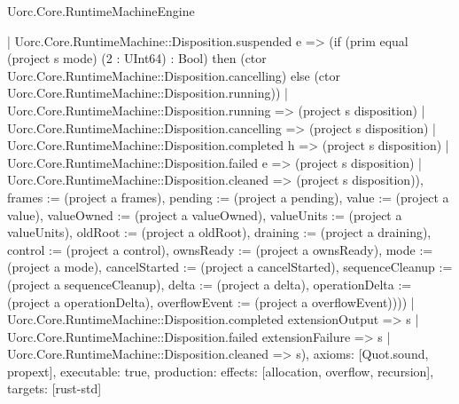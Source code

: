 \begin{lexlean}{Uorc.Core.RuntimeMachineEngine}
\begin{semanticmodule}
{{        | Uorc.Core.RuntimeMachine::Disposition.suspended e => (if (prim equal (project s mode) (2 : UInt64) : Bool) then (ctor Uorc.Core.RuntimeMachine::Disposition.cancelling) else (ctor Uorc.Core.RuntimeMachine::Disposition.running))
        | Uorc.Core.RuntimeMachine::Disposition.running => (project s disposition)
        | Uorc.Core.RuntimeMachine::Disposition.cancelling => (project s disposition)
        | Uorc.Core.RuntimeMachine::Disposition.completed h => (project s disposition)
        | Uorc.Core.RuntimeMachine::Disposition.failed e => (project s disposition)
        | Uorc.Core.RuntimeMachine::Disposition.cleaned => (project s disposition)), frames := (project a frames), pending := (project a pending), value := (project a value), valueOwned := (project a valueOwned), valueUnits := (project a valueUnits), oldRoot := (project a oldRoot), draining := (project a draining), control := (project a control), ownsReady := (project a ownsReady), mode := (project a mode), cancelStarted := (project a cancelStarted), sequenceCleanup := (project a sequenceCleanup), delta := (project a delta), operationDelta := (project a operationDelta), overflowEvent := (project a overflowEvent)})))
    | Uorc.Core.RuntimeMachine::Disposition.completed extensionOutput => s
    | Uorc.Core.RuntimeMachine::Disposition.failed extensionFailure => s
    | Uorc.Core.RuntimeMachine::Disposition.cleaned => s),
  axioms: [Quot.sound, propext],
  executable: true,
  production: {effects: [allocation, overflow, recursion], targets: [rust-std]}
}


\end{semanticmodule}
\end{lexlean}
